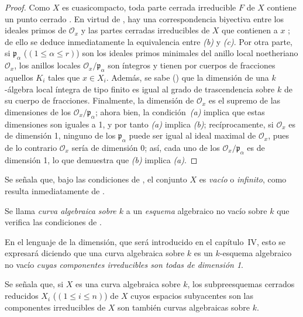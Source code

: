 \documentclass[oneside,10pt]{amsart}
\renewcommand{\leq}{\leqslant}
\let\EGAOriginalLabel\label
\renewcommand{\label}[1]{\phantomsection\EGAOriginalLabel{#1}}
\begin{document}
\begin{proof}
Como $X$ es cuasicompacto, toda parte cerrada irreducible $F$ de $X$ contiene un punto cerrado .
En virtud de , hay una correspondencia biyectiva entre los ideales primos de $\mathcal{O}_x$ y las partes cerradas irreducibles de $X$ que contienen a $x$ ;
de ello se deduce inmediatamente la equivalencia entre \emph{(b)} y \emph{(c)}.
Por otra parte, si $\mathfrak{p}_\alpha$ ($(1\leq\alpha\leq r)$) son los ideales primos minimales del anillo local noetheriano $\mathcal{O}_x$, los anillos locales $\mathcal{O}_x/\mathfrak{p}_\alpha$ son íntegros y tienen por cuerpos de fracciones aquellos $K_i$ tales que $x\in X_i$.
Además, se sabe (\cite[p.~4-06, th.~2]{I-1}) que la dimensión de una $k$-álgebra local íntegra de tipo finito es igual al grado de trascendencia sobre $k$ de su cuerpo de fracciones.
Finalmente, la dimensión de $\mathcal{O}_x$ es el supremo de las dimensiones de los $\mathcal{O}_x/\mathfrak{p}_\alpha$;
ahora bien, la condición~\emph{(a)} implica que estas dimensiones son iguales a 1, y por tanto \emph{(a)} implica \emph{(b)};
recíprocamente, si $\mathcal{O}_x$ es de dimensión 1, ninguno de los $\mathfrak{p}_\alpha$ puede ser igual al ideal maximal de $\mathcal{O}_x$, pues de lo contrario $\mathcal{O}_x$ sería de dimensión 0;
así, cada uno de los $\mathcal{O}_x/\mathfrak{p}_\alpha$ es de dimensión 1, lo que demuestra que \emph{(b)} implica \emph{(a)}.
\end{proof}

Se señala que, bajo las condiciones de , el conjunto $X$ es \emph{vacío} o \emph{infinito}, como resulta inmediatamente de .

\begin{definition}[7.4.2]
\label{II.7.4.2-fr}
Se llama \emph{curva algebraica sobre $k$} a un \emph{esquema} algebraico no vacío sobre $k$ que verifica las condiciones de .
\end{definition}

En el lenguaje de la dimensión, que será introducido en el capítulo~IV, esto se expresará diciendo que una curva algebraica sobre $k$ es un $k$-esquema algebraico no vacío \emph{cuyas componentes irreducibles son todas de dimensión 1}.

Se señala que, si $X$ es una curva algebraica sobre $k$, los subpreesquemas cerrados reducidos $X_i$ ($(1\leq i\leq n)$) de $X$ cuyos espacios subyacentes son las componentes irreducibles de $X$ son también curvas algebraicas sobre $k$.
\end{document}
